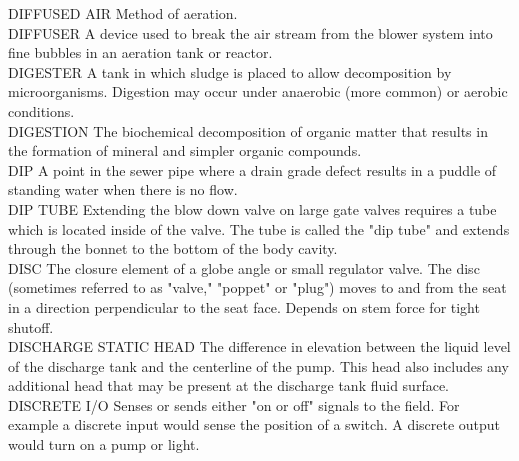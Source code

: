 \documentclass{article}
\begin{document}
DIFFUSED AIR
Method of aeration.
\vspace{0.3cm}\\
DIFFUSER
A device used to break the air stream from the blower system into fine bubbles in an aeration tank or reactor.
\vspace{0.3cm}\\
DIGESTER
A tank in which sludge is placed to allow decomposition by microorganisms. Digestion may occur under anaerobic (more common) or aerobic conditions.
\vspace{0.3cm}\\
DIGESTION
The biochemical decomposition of organic matter that results in the formation of mineral and simpler organic compounds.
\vspace{0.3cm}\\
DIP
A point in the sewer pipe where a drain grade defect results in a puddle of standing water when there is no flow. 
\vspace{0.3cm}\\
DIP TUBE
Extending the blow down valve on large gate valves requires a tube which is located inside of the valve. The tube is called the "dip tube" and extends through the bonnet to the bottom of the body cavity.
\vspace{0.3cm}\\
DISC
The closure element of a globe angle or small regulator valve. The disc (sometimes referred to as "valve," "poppet" or "plug") moves to and from the seat in a direction perpendicular to the seat face. Depends on stem force for tight shutoff.
\vspace{0.3cm}\\
DISCHARGE STATIC HEAD
The difference in elevation between the liquid level of the discharge tank and the centerline of the pump. This head also includes any additional head that may be present at the discharge tank fluid surface.
\vspace{0.3cm}\\

DISCRETE I/O
Senses or sends either "on or off" signals to the field. For example a discrete input would sense the position of a switch. A discrete output would turn on a pump or light.
\vspace{0.3cm}\\
\end{document}
